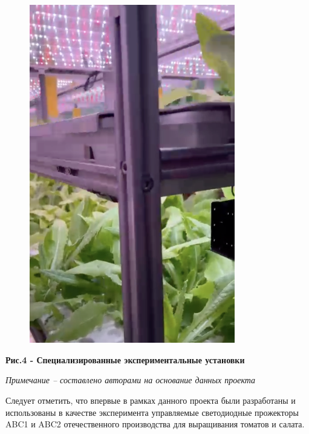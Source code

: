 \begin{figure}[H]
	\centering
	\includegraphics[width=0.8\textwidth]{media/ekon2/image50}
	\caption*{}
\end{figure}


{\bfseries Рис.4 - Специализированные экспериментальные установки}

\emph{Примечание -- составлено авторами на основание данных проекта}

Следует отметить, что впервые в рамках данного проекта были разработаны
и использованы в качестве эксперимента управляемые светодиодные
прожекторы ABC1 и ABC2 отечественного производства для выращивания
томатов и салата.

